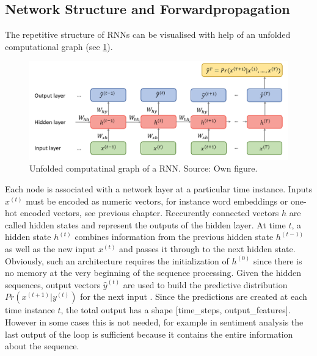 \documentclass[]{krantz}
\begin{document}
\hypertarget{network-structure-and-forwardpropagation}{%
\subsection{Network Structure and Forwardpropagation}\label{network-structure-and-forwardpropagation}}

The repetitive structure of RNNs can be visualised with help of an unfolded computational graph (see \ref{fig:01-02-unfold}).

\begin{figure}

{\centering \includegraphics[width=1\linewidth]{figures/01-02-rnns-and-their-applications-in-nlp/02_unfolded_graph} 

}

\caption{Unfolded computatinal graph of a RNN. Source: Own figure.}\label{fig:01-02-unfold}
\end{figure}

Each node is associated with a network layer at a particular time instance. Inputs \(x^{(t)}\) must be encoded as numeric vectors, for instance word embeddings or one-hot encoded vectors, see previous chapter. Reccurently connected vectors \(h\) are called hidden states and represent the outputs of the hidden layer. At time \(t\), a hidden state \(h^{(t)}\) combines information from the previous hidden state \(h^{(t-1)}\) as well as the new input \(x^{(t)}\) and passes it through to the next hidden state. Obviously, such an architecture requires the initialization of \(h^{(0)}\) since there is no memory at the very beginning of the sequence processing. Given the hidden sequences, output vectors \(\hat{y}^{(t)}\) are used to build the predictive distribution \(Pr(x^{(t+1)}|y^{(t)})\) for the next input \citep{graves2013generating}. Since the predictions are created at each time instance \(t\), the total output has a shape {[}time\_steps, output\_features{]}. However in some cases this is not needed, for example in sentiment analysis the last output of the loop is sufficient because it contains the entire information about the sequence. \citep{chollet2018deep}
\end{document}
